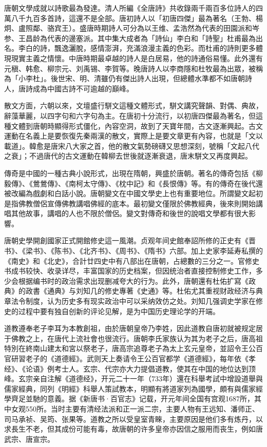 唐朝文學成就以詩歌最為發達。清人所編《全唐詩》共收錄兩千兩百多位詩人的四萬八千九百多首詩，這還不是全部。唐初詩人以「初唐四傑」最為著名（王勃、楊炯、盧照鄰、骆宾王）。盛唐時期詩人可分為以王维、孟浩然為代表的田園派和岑参、王昌龄為代表的邊塞派。其中集大成者為「詩仙」李白和「詩聖」杜甫最為出名。李白的詩，飄逸灑脫，感情澎湃，充滿浪漫主義的色彩。而杜甫的詩則更多體現現實主義之情懷。中唐時期最卓越的詩人是白居易，他的詩通俗易懂。此外還有元稹、韩愈、柳宗元、刘禹锡、李賀等。晚唐詩人以李商隱和杜牧最為出眾，被稱為「小李杜」。後世宋、明、清雖仍有傑出詩人出現，但總體水準都不如唐朝詩人，唐詩成為中國古詩不可逾越的巔峰。

散文方面，六朝以來，文壇盛行駢文這種文體形式，駢文講究聲韻、對偶、典故，辭藻華麗，以四字句和六字句為主。在唐初十分流行，以初唐四傑最為著名，但這種文體到唐朝時顯得形式僵化，內容空洞，故到了天寶年間，古文逐漸興起。古文運動在名義上是要恢復先秦兩漢的散文，實際上是要文章更有內容，也就是「文以載道」。韓愈是唐宋八大家之首，他的散文氣勢磅礴又思想深刻，號稱「文起八代之衰」；不過唐代的古文運動在韓柳去世後就逐漸衰退，唐末駢文又再度興起。

傳奇是中國的一種古典小說形式，出現在隋朝，興盛於唐朝。著名的傳奇包括《柳毅傳》、《鶯鶯傳》、《南柯太守傳》、《枕中記》和《長恨傳》等。有的傳奇在後代還被改編為戲劇和白話小說。唐朝變文在中國文學史上也有重要地位。所謂變文起初是指佛教僧侶宣傳佛教講唱佛經的底本。最初變文僅限於佛教經典，後來則開始講唱其他故事，講唱的人也不限於僧侶。變文對傳奇和後世的說唱文學都有很大影響。

唐朝史學開創國家正式開館修史這一風潮。贞观年间史館奉詔所修的正史有《晋书》、《梁书》、《陈书》、《北齐书》、《周书》、《隋书》六部。加上史家李延寿私撰的《南史》和《北史》，合計廿四史中有八部出在唐朝，占總數的三分之一。官修史书成书较快、收录详尽，丰富国家的历史档案，但因统治者直接控制修史工作，多少会根据编书时的政治需求出现删减夸大的行为。此外，唐朝還有杜佑扩寫《政典》的政書《通典》与刘知几的修史專著《史通》等。杜佑尤其重视财政经济与典章法令制度，认为历史多有现实政治中可以采纳效仿之处。刘知几强调史学家在修史的过程中要有独自创新的评论见解，是为中国历史理论学的开端。

道教遵奉老子李耳为本教創祖，由於唐朝皇帝乃李姓，因此道教自唐初就被规定居于佛教之上，在唐代上流社會也很流行。唐朝李氏家族认为其为老子之后，唐高祖特別在終南山建太和宮以祭老子，唐高宗追尊老子為太上玄元皇帝，並詔令王公百官研習老子的《道德經》。武则天上奏请令王公百官都学《道德經》，每年依《孝经》、《论语》例考士人。玄宗、代宗亦大力提倡道教，使其在中国的地位达到顶峰。玄宗亲自注解《道德经》，开元二十一年（733年）還在科舉考試中增設道舉與儒家經典，同列《明經》科舉人策試教本，明顯有將道家列為國學，頗有與儒家經學齊足並馳的意義。据《新唐书·百官志》记载，开元年间全国有宫观1687所，其中女观550所。当时主要有清经法派和正一派二宗，主要人物有王远知、潘师正、司马承祯、吴筠、张果等。道教之所以受皇室青睞，主要原因是他们多有炼丹，以求長生不老，但其成份可能有毒，故唐朝的许多皇帝亦因信之服用而丧生，例如唐武宗、唐宣宗。

